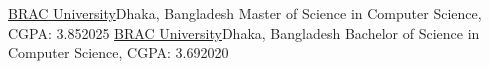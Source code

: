   \customSubHeadingContentStart
    \customSubHeading
      {\href{https://www.bracu.ac.bd/}{BRAC University}}{Dhaka, Bangladesh}
    \customRoleHeading
      {Master of Science in Computer Science, CGPA: 3.85}{2025}
    \vspace{-10pt}
    \customSubHeading
      {\href{https://www.bracu.ac.bd/}{BRAC University}}{Dhaka, Bangladesh}
    \customRoleHeading
      {Bachelor of Science in Computer Science, CGPA: 3.69}{2020}
  \customSubHeadingContentEnd
\vspace{-8pt}